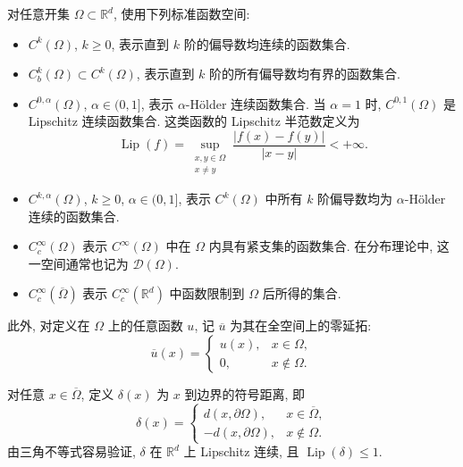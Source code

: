 对任意开集 $\Omega\subset\mathbb{R}^d$, 使用下列标准函数空间:
\begin{itemize}
\item $C^k(\Omega)$, $k\geq0$, 表示直到 $k$ 阶的偏导数均连续的函数集合.
\item $C_b^k(\Omega)\subset C^k(\Omega)$, 表示直到 $k$ 阶的所有偏导数均有界的函数集合.
\item $C^{0,\alpha}(\Omega)$, $\alpha\in(0,1]$, 表示 $\alpha$-Hölder 连续函数集合. 当 $\alpha=1$ 时, $C^{0,1}(\Omega)$ 是 Lipschitz 连续函数集合. 这类函数的 Lipschitz 半范数定义为
\[
  \operatorname{Lip}(f)=\sup_{\substack{x,y\in\Omega\\x\neq y}}
  \frac{|f(x)-f(y)|}{|x-y|}<+\infty.
\]
\item $C^{k,\alpha}(\Omega)$, $k\geq0$, $\alpha\in(0,1]$, 表示 $C^k(\Omega)$ 中所有 $k$ 阶偏导数均为 $\alpha$-Hölder 连续的函数集合.
\item $C_c^\infty(\Omega)$ 表示 $C^\infty(\Omega)$ 中在 $\Omega$ 内具有紧支集的函数集合. 在分布理论中, 这一空间通常也记为 $\mathcal{D}(\Omega)$.
\item $C_c^\infty(\overline\Omega)$ 表示 $C_c^\infty(\mathbb{R}^d)$ 中函数限制到 $\Omega$ 后所得的集合.
\end{itemize}

此外, 对定义在 $\Omega$ 上的任意函数 $u$, 记 $\overline u$ 为其在全空间上的零延拓:
\[
  \overline u(x)=
  \begin{cases}
  u(x),&x\in\Omega,\\
  0,&x\notin\Omega.
  \end{cases}
\]

对任意 $x\in\overline{\Omega}$, 定义 $\delta(x)$ 为 $x$ 到边界的符号距离, 即
\begin{equation}
\label{eq:chap2-signed-distance}
  \delta(x)=
  \begin{cases}
  d(x,\partial\Omega),&x\in\overline{\Omega},\\
  -d(x,\partial\Omega),&x\notin\Omega.
  \end{cases}
\end{equation}
由三角不等式容易验证, $\delta$ 在 $\mathbb{R}^d$ 上 Lipschitz 连续, 且 $\operatorname{Lip}(\delta)\leq1$.
